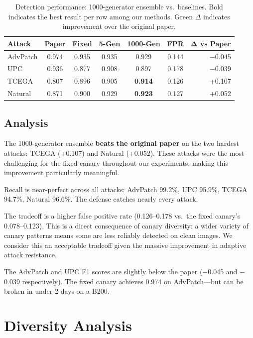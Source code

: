 \documentclass[11pt,a4paper]{article}
\begin{document}
\begin{table}[H]
\centering
\caption{Detection performance: 1000-generator ensemble vs.\ baselines. Bold indicates the best result per row among our methods. Green $\Delta$ indicates improvement over the original paper.}
\begin{tabular}{lcccccr}
\toprule
\textbf{Attack} & \textbf{Paper} & \textbf{Fixed} & \textbf{5-Gen} & \textbf{1000-Gen} & \textbf{FPR} & $\boldsymbol{\Delta}$ \textbf{vs Paper} \\
\midrule
AdvPatch & 0.974 & 0.935 & 0.935 & 0.929 & 0.144 & $-$0.045 \\
UPC & 0.936 & 0.877 & 0.908 & 0.897 & 0.178 & $-$0.039 \\
TCEGA & 0.807 & 0.896 & 0.905 & \textbf{0.914} & 0.126 & \textcolor{green!60!black}{+0.107} \\
Natural & 0.871 & 0.900 & 0.929 & \textbf{0.923} & 0.127 & \textcolor{green!60!black}{+0.052} \\
\bottomrule
\end{tabular}
\label{tab:eval_results}
\end{table}

\subsection{Analysis}

The 1000-generator ensemble \textbf{beats the original paper} on the two hardest attacks: TCEGA (+0.107) and Natural (+0.052). These attacks were the most challenging for the fixed canary throughout our experiments, making this improvement particularly meaningful.

Recall is near-perfect across all attacks: AdvPatch 99.2\%, UPC 95.9\%, TCEGA 94.7\%, Natural 96.6\%. The defense catches nearly every attack.

The tradeoff is a higher false positive rate (0.126--0.178 vs.\ the fixed canary's 0.078--0.123). This is a direct consequence of canary diversity: a wider variety of canary patterns means some are less reliably detected on clean images. We consider this an acceptable tradeoff given the massive improvement in adaptive attack resistance.

The AdvPatch and UPC F1 scores are slightly below the paper ($-$0.045 and $-$0.039 respectively). The fixed canary achieves 0.974 on AdvPatch---but can be broken in under 2 days on a B200.

\section{Diversity Analysis}
\end{document}
